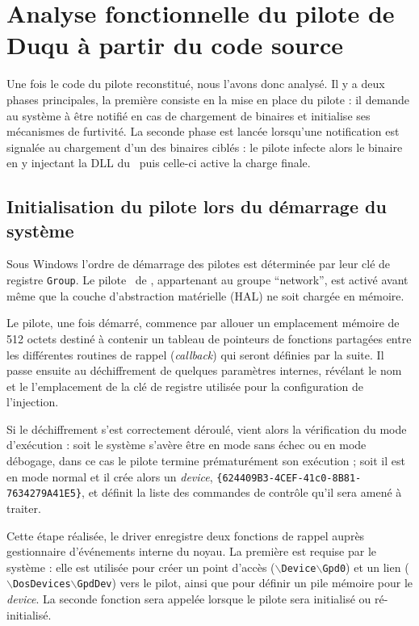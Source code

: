 \section{Analyse fonctionnelle du pilote de Duqu à partir du code source}
Une fois le code du pilote reconstitué, nous l'avons donc analysé.
Il y a deux phases principales, la première consiste en la mise en place du pilote : il demande au système à être notifié en cas de chargement de binaires et initialise ses mécanismes de furtivité.
La seconde phase est lancée lorsqu'une notification est signalée au chargement d'un des binaires ciblés : le pilote infecte alors le binaire en y injectant la DLL du \duqu\ puis celle-ci active la charge finale.

\subsection{Initialisation du pilote lors du démarrage du système}
Sous Windows l'ordre de démarrage des pilotes est déterminée par leur clé de registre \texttt{Group}.
Le pilote \driver\ de \duqu, appartenant au groupe ``network'', est activé avant même que la couche d'abstraction matérielle (HAL) ne soit chargée en mémoire.

Le pilote, une fois démarré, commence par allouer un emplacement mémoire de 512 octets destiné à contenir un tableau de pointeurs de fonctions partagées entre les différentes routines de rappel (\emph{callback}) qui seront définies par la suite.
Il passe ensuite au déchiffrement de quelques paramètres internes, révélant le nom et le l'emplacement de la clé de registre utilisée pour la configuration de l'injection.

Si le déchiffrement s'est correctement déroulé, vient alors la vérification du mode d'exécution : soit le système s'avère être en mode sans échec ou en mode débogage, dans ce cas le pilote termine prématurément son exécution ; soit il est en mode normal et il crée alors un \emph{device}, \texttt{\{624409B3-4CEF-41c0-8B81-7634279A41E5\}}, et définit la liste des commandes de contrôle qu'il sera amené à traiter.

Cette étape réalisée, le driver enregistre deux fonctions de rappel auprès gestionnaire d'événements interne du noyau.
La première est requise par le système : elle est utilisée pour créer un point d'accès ($\backslash$\texttt{Device}$\backslash$\texttt{Gpd0}) et un lien ($\backslash$\texttt{DosDevices}$\backslash$\texttt{GpdDev}) vers le pilot, ainsi que pour définir un pile mémoire pour le \emph{device}.
La seconde fonction sera appelée lorsque le pilote sera initialisé ou ré-initialisé. 


